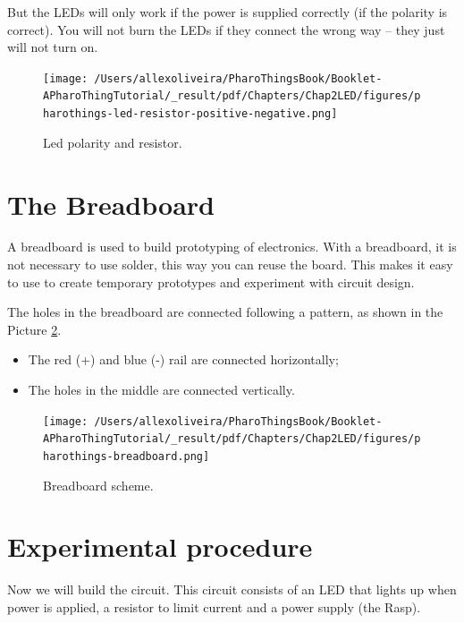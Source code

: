 \documentclass[10pt,twoside,english]{_support/latex/sbabook/sbabook}
\begin{document}
But the LEDs will only work if the power is supplied correctly (if the polarity is correct). You will not burn the LEDs if they connect the wrong way – they just will not turn on.


\begin{figure}

\begin{center}
\texttt{[image: /Users/allexoliveira/PharoThingsBook/Booklet-APharoThingTutorial/\_result/pdf/Chapters/Chap2LED/figures/pharothings-led-resistor-positive-negative.png]}\caption{Led polarity and resistor.\label{Ledpolarity}}\end{center}
\end{figure}

\section{The Breadboard}
A breadboard is used to build prototyping of electronics. With a breadboard, it is not necessary to use solder, this way you can reuse the board. This makes it easy to use to create temporary prototypes and experiment with circuit design.

The holes in the breadboard are connected following a pattern, as shown in the Picture \ref{Breadboard}.

\begin{itemize}
\item The red (+) and blue (-) rail are connected horizontally;
\item The holes in the middle are connected vertically.
\end{itemize}


\begin{figure}

\begin{center}
\texttt{[image: /Users/allexoliveira/PharoThingsBook/Booklet-APharoThingTutorial/\_result/pdf/Chapters/Chap2LED/figures/pharothings-breadboard.png]}\caption{Breadboard scheme.\label{Breadboard}}\end{center}
\end{figure}

\section{Experimental procedure}
Now we will build the circuit. This circuit consists of an LED that lights up when power is applied, a resistor to limit current and a power supply (the Rasp).
\end{document}
